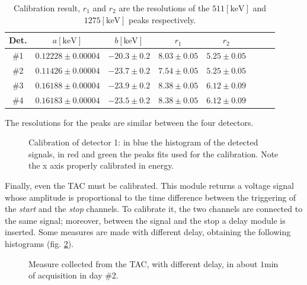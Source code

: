 \documentclass[11pt,a4 paper]{article}
\begin{document}
\begin{table}[H]
    \centering
    \begin{tabular}{cccccccc}
        \toprule
        Det. & $a [\si{\kilo\electronvolt}]$ & $b [\si{\kilo\electronvolt}]$ & $r_1$ & $r_2$ \\
        \midrule
        \#1 & $0.12228\pm0.00004$ & $-20.3\pm0.2$ & $8.03\pm0.05$ & $5.25\pm0.05$ \\
        \#2 & $0.11426\pm0.00004$ & $-23.7\pm0.2$ & $7.54\pm0.05$ & $5.25\pm0.05$ \\
        \#3 & $0.16188\pm0.00004$ & $-23.9\pm0.2$ & $8.38\pm0.05$ & $6.12\pm0.09$ \\
        \#4 & $0.16183\pm0.00004$ & $-23.5\pm0.2$ & $8.38\pm0.05$ & $6.12\pm0.09$ \\
        \bottomrule
    \end{tabular}
    \caption{Calibration result, $r_1$ and $r_2$ are the resolutions of the $511[\si{\kilo\electronvolt}]$ and $1275[\si{\kilo\electronvolt}]$ peaks respectively.}
    \label{tab:calib2}
\end{table}
The resolutions for the peaks are similar between the four detectors.

\begin{figure}[H]
    \centering
    \caption{Calibration of detector 1: in blue the histogram of the detected signals, in red and green the peaks fits used for the calibration. Note the x axis properly calibrated in energy.}
    \label{fig:det1_calibr}
\end{figure}


Finally, even the TAC must be calibrated. This module returns a voltage signal whose amplitude is proportional to the time difference between the triggering of the \emph{start} and the \emph{stop} channels. To calibrate it, the two channels are connected to the same signal; moreover, between the signal and the stop a delay module is inserted. Some measures are made with different delay, obtaining the following histograms (fig. \ref{fig:tachisto}).

\begin{figure}
    \centering
    \caption{Measure collected from the TAC, with different delay, in about $1\si{\minute}$ of acquisition in day \#2.}
    \label{fig:tachisto}
\end{figure}
\end{document}
